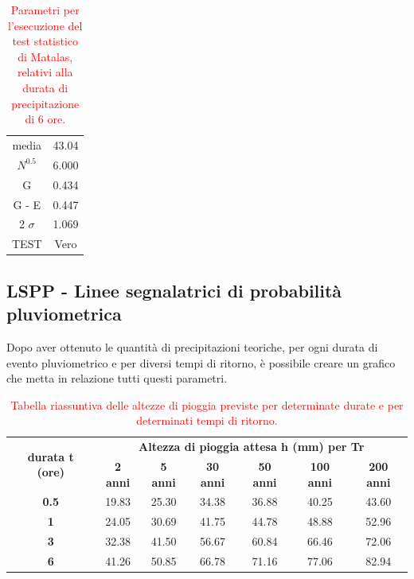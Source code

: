 \begin{table}[H] \centering
    \caption{\textcolor{red}{Parametri per l'esecuzione del test statistico di Matalas, relativi alla durata di precipitazione di 6 ore.}}
    \begin{tabular}{cc}
    \toprule
    media                  & 43.04 \\
    $N ^{0.5}$             &  6.000\\
    G                      & 0.434 \\
    G - E                  &  0.447\\
    2 $\sigma$             & 1.069 \\
    TEST                   & Vero \\
    \bottomrule
    \end{tabular}
\end{table}

\subsection{LSPP - Linee segnalatrici di probabilità pluviometrica}
Dopo aver ottenuto le quantità di precipitazioni teoriche, per ogni durata di evento pluviometrico e per diversi tempi di ritorno, è possibile creare un grafico che metta in relazione tutti questi parametri.

\begin{table}[H]\centering
    \caption{\textcolor{red}{Tabella riassuntiva delle altezze di pioggia previste per determinate durate e per determinati tempi di ritorno.}}
    \begin{tabular}{ccccccc}
    \toprule
    \multirow{2}{*}{\textbf{durata t (ore)}} & \multicolumn{6}{c}{\textbf{Altezza di pioggia attesa h (mm) per Tr}} \\
  & \textbf{2 anni} & \textbf{5 anni} & \textbf{30 anni} & \textbf{50 anni} & \textbf{100 anni} & \textbf{200 anni} \\
    \textbf{0.5}                             & 19.83           & 25.30           & 34.38            & 36.88            & 40.25             & 43.60             \\
    \textbf{1}                               & 24.05           & 30.69           & 41.75            & 44.78            & 48.88             & 52.96             \\
    \textbf{3}                               & 32.38           & 41.50           & 56.67            & 60.84            & 66.46             & 72.06             \\
    \textbf{6}                               & 41.26           & 50.85           & 66.78            & 71.16            & 77.06             & 82.94            \\
    \bottomrule
    \end{tabular}
    \label{figure:altezze_critiche_pioggia}
    \end{table}

